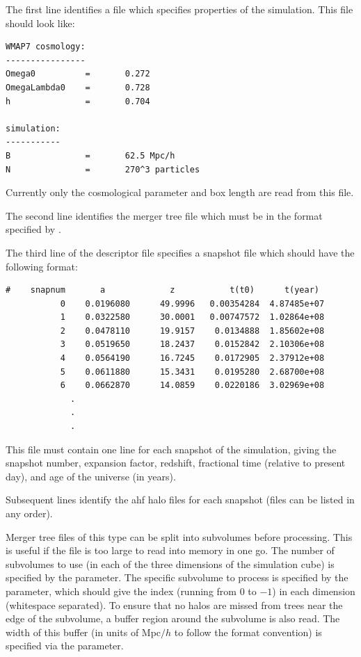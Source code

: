 The first line identifies a file which specifies properties of the simulation. This file should look like:
\begin{verbatim}
WMAP7 cosmology:
----------------
Omega0          =       0.272
OmegaLambda0    =       0.728
h               =       0.704

simulation:
-----------
B               =       62.5 Mpc/h
N               =       270^3 particles
\end{verbatim}
Currently only the cosmological parameter and box length are read from this file.

The second line identifies the merger tree file which must be in the format specified by \cite{srisawat_sussing_2013}.

The third line of the descriptor file specifies a snapshot file which should have the following format:
\begin{verbatim}
#    snapnum       a             z           t(t0)      t(year)
           0    0.0196080      49.9996   0.00354284  4.87485e+07
           1    0.0322580      30.0001   0.00747572  1.02864e+08
           2    0.0478110      19.9157    0.0134888  1.85602e+08
           3    0.0519650      18.2437    0.0152842  2.10306e+08
           4    0.0564190      16.7245    0.0172905  2.37912e+08
           5    0.0611880      15.3431    0.0195280  2.68700e+08
           6    0.0662870      14.0859    0.0220186  3.02969e+08
             .
             .
             .
\end{verbatim}
This file must contain one line for each snapshot of the simulation, giving the snapshot number, expansion factor, redshift, fractional time (relative to present day), and age of the universe (in years).

Subsequent lines identify the \gls{ahf} halo files for each snapshot (files can be listed in any order).

Merger tree files of this type can be split into subvolumes before processing. This is useful if the file is too large to read into memory in one go. The number of subvolumes to use (in each of the three dimensions of the simulation cube) is specified by the {\normalfont \ttfamily [mergerTreeImportSussingSubvolumeCount]} parameter. The specific subvolume to process is specified by the {\normalfont \ttfamily [mergerTreeImportSussingSubvolumeIndex]} parameter, which should give the index (running from $0$ to {\normalfont \ttfamily [mergerTreeImportSussingSubvolumeCount]}$-1$) in each dimension (whitespace separated). To ensure that no halos are missed from trees near the edge of the subvolume, a buffer region around the subvolume is also read. The width of this buffer (in units of Mpc$/h$ to follow the format convention) is specified via the {\normalfont \ttfamily [mergerTreeImportSussingSubvolumeBuffer]} parameter. 

